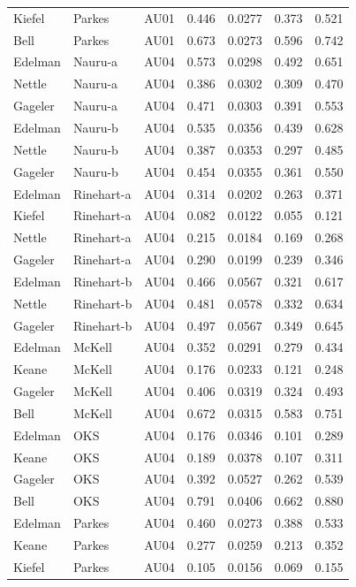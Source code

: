 \documentclass{monashthesis}
\begin{document}
\begin{center}
\begin{longtable}{lllllll}
Kiefel & Parkes & AU01 & 0.446 & 0.0277 & 0.373 & 0.521 \\
Bell & Parkes & AU01 & 0.673 & 0.0273 & 0.596 & 0.742 \\
Edelman & Nauru-a & AU04 & 0.573 & 0.0298 & 0.492 & 0.651 \\
Nettle & Nauru-a & AU04 & 0.386 & 0.0302 & 0.309 & 0.470 \\
Gageler & Nauru-a & AU04 & 0.471 & 0.0303 & 0.391 & 0.553 \\
Edelman & Nauru-b & AU04 & 0.535 & 0.0356 & 0.439 & 0.628 \\
Nettle & Nauru-b & AU04 & 0.387 & 0.0353 & 0.297 & 0.485 \\
Gageler & Nauru-b & AU04 & 0.454 & 0.0355 & 0.361 & 0.550 \\
Edelman & Rinehart-a & AU04 & 0.314 & 0.0202 & 0.263 & 0.371 \\
Kiefel & Rinehart-a & AU04 & 0.082 & 0.0122 & 0.055 & 0.121 \\
Nettle & Rinehart-a & AU04 & 0.215 & 0.0184 & 0.169 & 0.268 \\
Gageler & Rinehart-a & AU04 & 0.290 & 0.0199 & 0.239 & 0.346 \\
Edelman & Rinehart-b & AU04 & 0.466 & 0.0567 & 0.321 & 0.617 \\
Nettle & Rinehart-b & AU04 & 0.481 & 0.0578 & 0.332 & 0.634 \\
Gageler & Rinehart-b & AU04 & 0.497 & 0.0567 & 0.349 & 0.645 \\
Edelman & McKell & AU04 & 0.352 & 0.0291 & 0.279 & 0.434 \\
Keane & McKell & AU04 & 0.176 & 0.0233 & 0.121 & 0.248 \\
Gageler & McKell & AU04 & 0.406 & 0.0319 & 0.324 & 0.493 \\
Bell & McKell & AU04 & 0.672 & 0.0315 & 0.583 & 0.751 \\
Edelman & OKS & AU04 & 0.176 & 0.0346 & 0.101 & 0.289 \\
Keane & OKS & AU04 & 0.189 & 0.0378 & 0.107 & 0.311 \\
Gageler & OKS & AU04 & 0.392 & 0.0527 & 0.262 & 0.539 \\
Bell & OKS & AU04 & 0.791 & 0.0406 & 0.662 & 0.880 \\
Edelman & Parkes & AU04 & 0.460 & 0.0273 & 0.388 & 0.533 \\
Keane & Parkes & AU04 & 0.277 & 0.0259 & 0.213 & 0.352 \\
Kiefel & Parkes & AU04 & 0.105 & 0.0156 & 0.069 & 0.155 \\

\end{longtable}
\end{center}
\end{document}
